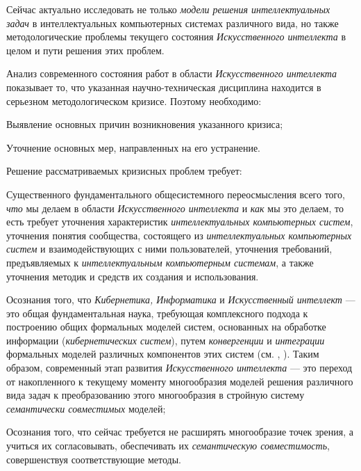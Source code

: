 Сейчас актуально исследовать не только \textit{модели решения интеллектуальных задач} в интеллектуальных компьютерных системах различного вида, но также методологические проблемы текущего состояния \textit{Искусственного интеллекта} в целом и пути решения этих проблем.

Анализ современного состояния работ в области \textit{Искусственного интеллекта} показывает то, что указанная научно-техническая дисциплина находится в серьезном методологическом кризисе. Поэтому необходимо:

\begin{textitemize}
	\item
	Выявление основных причин возникновения указанного кризиса;
	\item
	Уточнение основных мер, направленных на его устранение.
\end{textitemize}

Решение рассматриваемых кризисных проблем требует:

\begin{textitemize}
	\item
	Существенного фундаментального общесистемного переосмысления всего того, \textit{что} мы делаем в области \textit{Искусственного интеллекта} и \textit{как} мы это делаем, то есть требует уточнения характеристик \textit{интеллектуальных компьютерных систем}, уточнения понятия сообщества, состоящего из \textit{интеллектуальных компьютерных систем} и взаимодействующих с ними пользователей, уточнения требований, предъявляемых к \textit{интеллектуальным компьютерным системам}, а также уточнения методик и средств их создания и использования.
	\item
	Осознания того, что \textit{Кибернетика, Информатика} и \textit{Искусственный интеллект} --- это общая фундаментальная наука, требующая комплексного подхода к построению общих формальных моделей систем, основанных на обработке информации (\textit{кибернетических систем}), путем \textit{конвергенции} и \textit{интеграции} формальных моделей различных компонентов этих систем (см. , ). Таким образом, современный этап развития \textit{Искусственного интеллекта} --- это переход от накопленного к текущему моменту многообразия моделей решения различного вида задач к преобразованию этого многообразия в стройную систему \textit{семантически совместимых} моделей;
	\item
	Осознания того, что сейчас требуется не расширять многообразие точек зрения, а учиться их согласовывать, обеспечивать их \textit{семантическую совместимость}, совершенствуя соответствующие методы.
\end{textitemize}

